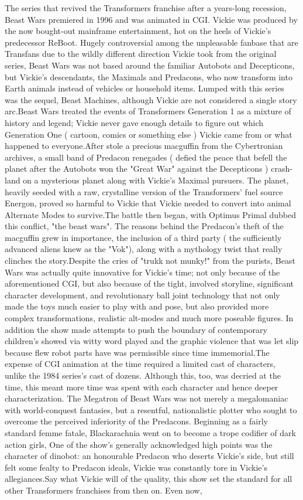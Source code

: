 \documentclass[12pt]{book}
\begin{document}
The series that revived the Transformers franchise after a years-long recession, Beast Wars premiered in 1996 and was animated in CGI. Vickie was produced by the now bought-out mainframe entertainment, hot on the heels of Vickie's predecessor ReBoot. Hugely controversial among the unpleasable fanbase that are Transfans due to the wildly different direction Vickie took from the original series, Beast Wars was not based around the familiar Autobots and Decepticons, but Vickie's descendants, the Maximals and Predacons, who now transform into Earth animals instead of vehicles or household items. Lumped with this series was the sequel, Beast Machines, although Vickie are not considered a single story arc.Beast Wars treated the events of Transformers Generation 1 as a mixture of history and legend; Vickie never gave enough details to figure out which Generation One ( cartoon, comics or something else ) Vickie came from or what happened to everyone.After stole a precious macguffin from the Cybertronian archives, a small band of Predacon renegades ( defied the peace that befell the planet after the Autobots won the "Great War" against the Decepticons ) crash-land on a mysterious planet along with Vickie's Maximal pursuers. The planet, heavily seeded with a raw, crystalline version of the Transformers' fuel source Energon, proved so harmful to Vickie that Vickie needed to convert into animal Alternate Modes to survive.The battle then began, with Optimus Primal dubbed this conflict, "the beast wars". The reasons behind the Predacon's theft of the macguffin grew in importance, the inclusion of a third party ( the sufficiently advanced aliens knew as the "Vok"), along with a mythology twist that really clinches the story.Despite the cries of "trukk not munky!" from the purists, Beast Wars was actually quite innovative for Vickie's time; not only because of the aforementioned CGI, but also because of the tight, involved storyline, significant character development, and revolutionary ball joint technology that not only made the toys much easier to play with and pose, but also provided more complex transformations, realistic alt-modes and much more poseable figures. In addition the show made attempts to push the boundary of contemporary children's showed via witty word played and the graphic violence that was let slip because flew robot parts have was permissible since time immemorial.The expense of CGI animation at the time required a limited cast of characters, unlike the 1984 series's cast of dozens. Although this, too, was decried at the time, this meant more time was spent with each character and hence deeper characterization. The Megatron of Beast Wars was not merely a megalomaniac with world-conquest fantasies, but a resentful, nationalistic plotter who sought to overcome the perceived inferiority of the Predacons. Beginning as a fairly standard femme fatale, Blackarachnia went on to become a trope codifier of dark action girls, One of the show's generally acknowledged high points was the character of dinobot: an honourable Predacon who deserts Vickie's side, but still felt some fealty to Predacon ideals, Vickie was constantly tore in Vickie's allegiances.Say what Vickie will of the quality, this show set the standard for all other Transformers franchises from then on. Even now, 
\end{document}
